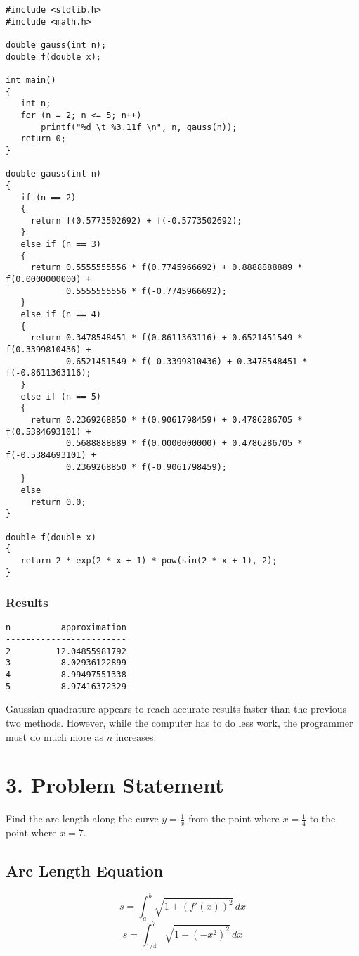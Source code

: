 \documentclass{article}
\begin{document}
\begin{verbatim}
#include <stdlib.h>
#include <math.h>

double gauss(int n);
double f(double x);

int main()
{  
   int n;
   for (n = 2; n <= 5; n++)
       printf("%d \t %3.11f \n", n, gauss(n));
   return 0;
}

double gauss(int n)
{
   if (n == 2)
   {
     return f(0.5773502692) + f(-0.5773502692);
   }
   else if (n == 3)
   {
     return 0.5555555556 * f(0.7745966692) + 0.8888888889 * f(0.0000000000) + 
            0.5555555556 * f(-0.7745966692);
   }
   else if (n == 4)
   {
     return 0.3478548451 * f(0.8611363116) + 0.6521451549 * f(0.3399810436) + 
            0.6521451549 * f(-0.3399810436) + 0.3478548451 * f(-0.8611363116);
   }
   else if (n == 5)
   {
     return 0.2369268850 * f(0.9061798459) + 0.4786286705 * f(0.5384693101) + 
            0.5688888889 * f(0.0000000000) + 0.4786286705 * f(-0.5384693101) + 
            0.2369268850 * f(-0.9061798459);
   }
   else
     return 0.0;
}

double f(double x)
{
   return 2 * exp(2 * x + 1) * pow(sin(2 * x + 1), 2);
}

\end{verbatim}

\subsubsection*{Results}

\begin{verbatim}
n          approximation
------------------------
2         12.04855981792
3          8.02936122899
4          8.99497551338
5          8.97416372329
\end{verbatim}

Gaussian quadrature appears to reach accurate results faster than the previous
two methods.  However, while the computer has to do less work, the programmer
must do much more as $n$ increases.



\section*{3.   Problem Statement}
Find the arc length along the curve $y = \frac{1}{x}$ from the point where 
$x = \frac{1}{4}$ to the point where $x = 7$.

\subsection*{Arc Length Equation}
$$
s = \int_{a}^{b} \sqrt{1 + (f'(x))^2} \, dx
$$
$$
s = \int_{1/4}^{7} \sqrt{1 + (-x^2)^2} \, dx
$$
\end{document}
